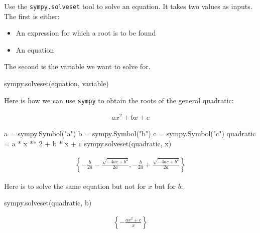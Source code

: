\begin{pyin}
Use the \texttt{sympy.solveset} tool to solve an equation. It takes two values as
inputs. The first is either:
\begin{itemize}
\item 

An expression for which a root is to be found

\item 

An equation

\end{itemize}


The second is the variable we want to solve for.

\begin{pyin}
sympy.solveset(equation, variable)
\end{pyin}


Here is how we can use \texttt{sympy} to obtain the roots of the general quadratic:

\begin{equation*}
\begin{split}
a x ^ 2 + bx + c
\end{split}
\end{equation*}



\begin{pyin}
a = sympy.Symbol("a")
b = sympy.Symbol("b")
c = sympy.Symbol("c")
quadratic = a * x ** 2 + b * x + c
sympy.solveset(quadratic, x)
\end{pyin}




\begin{equation*}
\begin{split}\displaystyle \left\{- \frac{b}{2 a} - \frac{\sqrt{- 4 a c + b^{2}}}{2 a}, - \frac{b}{2 a} + \frac{\sqrt{- 4 a c + b^{2}}}{2 a}\right\}\end{split}
\end{equation*}




Here is to solve the same equation but not for \(x\) but for
\(b\):




\begin{pyin}
sympy.solveset(quadratic, b)
\end{pyin}




\begin{equation*}
\begin{split}\displaystyle \left\{- \frac{a x^{2} + c}{x}\right\}\end{split}
\end{equation*}


\end{pyin}
